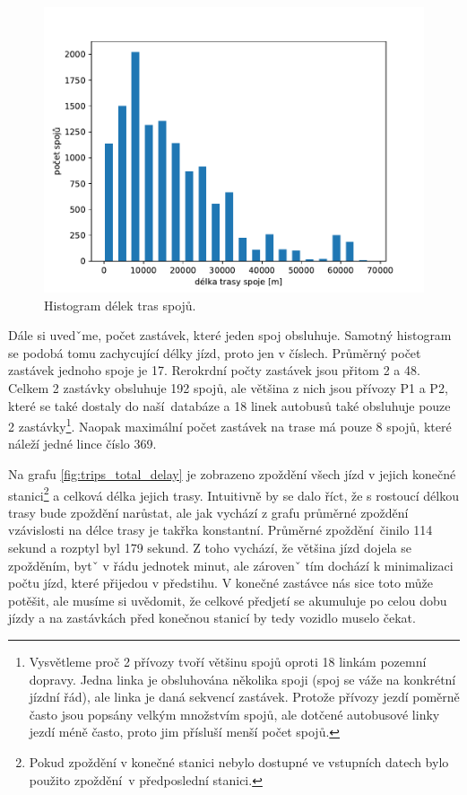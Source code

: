 \begin{figure}
	\centering
  \includegraphics[width=1\linewidth]{../img/trips_len}
  \caption{Histogram délek tras spojů.}
  \label{fig:trips_len}
\end{figure}

\bigbreak

Dále si uvedˇme, počet zastávek, které jeden spoj obsluhuje. Samotný histogram se podobá tomu zachycující délky jízd, proto jen v číslech. Průměrný počet zastávek jednoho spoje je 17. Rerokrdní počty zastávek jsou přitom 2 a 48. Celkem 2 zastávky obsluhuje 192 spojů, ale většina z nich jsou přívozy P1 a P2, které se také dostaly do naší databáze a 18 linek autobusů také obsluhuje pouze 2 zastávky\footnote{Vysvětleme proč 2 přívozy tvoří většinu spojů oproti 18 linkám pozemní dopravy. Jedna linka je obsluhována několika spoji (spoj se váže na konkrétní jízdní řád), ale linka je daná sekvencí zastávek. Protože přívozy jezdí poměrně často jsou popsány velkým množstvím spojů, ale dotčené autobusové linky jezdí méně často, proto jim přísluší menší počet spojů.}. Naopak maximální počet zastávek na trase má pouze 8 spojů, které náleží jedné lince číslo 369.

\bigbreak

Na grafu \ref{fig:trips_total_delay} je zobrazeno zpoždění všech jízd v jejich konečné stanici\footnote{Pokud zpoždění v konečné stanici nebylo dostupné ve vstupních datech bylo použito zpoždění v předposlední stanici.} a celková délka jejich trasy. Intuitivně by se dalo říct, že s rostoucí délkou trasy bude zpoždění narůstat, ale jak vychází z grafu průměrné zpoždění vzávislosti na délce trasy je takřka konstantní. Průměrné zpoždění činilo 114 sekund a rozptyl byl 179 sekund. Z toho vychází, že většina jízd dojela se zpožděním, bytˇ v řádu jednotek minut, ale zárovenˇ tím dochází k minimalizaci počtu jízd, které přijedou v předstihu. V konečné zastávce nás sice toto může potěšit, ale musíme si uvědomit, že celkové předjetí se akumuluje po celou dobu jízdy a na zastávkách před konečnou stanicí by tedy vozidlo muselo čekat.

